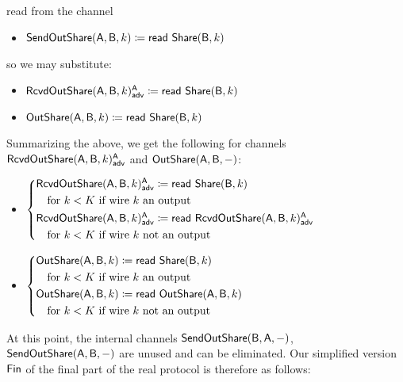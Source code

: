 read from the channel
\begin{itemize}
\item $\mathsf{SendOutShare}(\mathsf{A},\mathsf{B},k) \coloneqq \mathsf{read} \ \mathsf{Share}(\mathsf{B},k)$
\end{itemize}
so we may substitute:
\begin{itemize}
\item {\color{blue} $\mathsf{RcvdOutShare}(\mathsf{A},\mathsf{B},k)^{\mathsf{A}}_{\mathsf{adv}} \coloneqq \mathsf{read} \ \mathsf{Share}(\mathsf{B},k)$}
\item $\mathsf{OutShare}(\mathsf{A},\mathsf{B},k) \coloneqq \mathsf{read} \ \mathsf{Share}(\mathsf{B},k)$
\end{itemize}
Summarizing the above, we get the following for channels $\mathsf{RcvdOutShare}(\mathsf{A},\mathsf{B},k)^{\mathsf{A}}_{\mathsf{adv}}$ and $\mathsf{OutShare}(\mathsf{A},\mathsf{B},-)$:
\begin{itemize}
\item {\color{blue} $\begin{cases*} \LeakRcvdOutShare(\A,\B,k)^\A_\adv \coloneqq \read{\Share(\B,k)} \\ \hspace{10pt} \text{for $k < K$ if wire $k$ an output} \\ \LeakRcvdOutShare(\A,\B,k)^\A_\adv \coloneqq \read{\LeakRcvdOutShare(\A,\B,k)^\A_\adv} \\ \hspace{10pt} \text{for $k < K$ if wire $k$ not an output} \end{cases*}$}
\item $\begin{cases*} \OutShare(\A,\B,k) \coloneqq \read{\Share(\B,k)} \\ \hspace{10pt} \text{for $k < K$ if wire $k$ an output} \\ \OutShare(\A,\B,k) \coloneqq \read{\OutShare(\A,\B,k)} \\ \hspace{10pt} \text{for $k < K$ if wire $k$ not an output} \end{cases*}$
\end{itemize}
At this point, the internal channels $\mathsf{SendOutShare}(\mathsf{B},\mathsf{A},-)$, $\mathsf{SendOutShare}(\mathsf{A},\mathsf{B},-)$ are unused and can be eliminated. Our simplified version $\mathsf{Fin}$ of the final part of the real protocol is therefore as follows:

